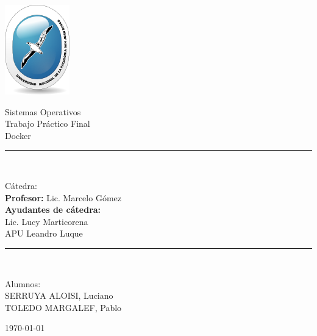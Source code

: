 \documentclass[12pt]{extarticle}
\newcommand{\fecha}{\today}
\begin{document}
    \begin{titlepage}

        \begin{center}
            \includegraphics{logoUnpsjb.png}
            \linebreak
            \begin{huge}
                Sistemas Operativos \\ Trabajo Práctico Final \\ Docker\\
            \end{huge}
            \vspace*{10mm}
            \rule{10cm}{0.1mm}\\
            \vspace*{3mm}
            \begin{LARGE}
                Cátedra:\\
                \textbf{Profesor:} Lic. Marcelo Gómez\\
                \vspace*{5mm}
                \textbf{Ayudantes de cátedra:}\\ Lic. Lucy Marticorena\\APU Leandro Luque\\
            \end{LARGE}
            \vspace*{3mm}
            \rule{10cm}{0.1mm}\\
            \vspace*{10mm}
            \begin{LARGE}
                Alumnos:\\
                SERRUYA ALOISI, Luciano\\
                TOLEDO MARGALEF, Pablo\\
            \end{LARGE}
            \vspace*{5mm}
            \Large\fecha
    \end{center}

    \end{titlepage}
\end{document}
